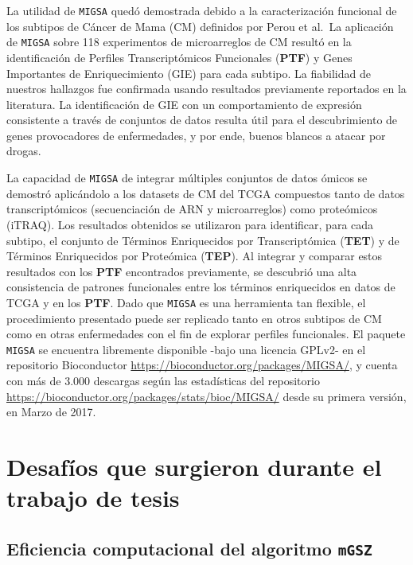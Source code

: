 \documentclass[12pt,twoside]{reedthesis}
\begin{document}
\par

La utilidad de \texttt{MIGSA} quedó demostrada debido a la caracterización funcional de los subtipos de Cáncer de Mama (CM) definidos por Perou et al.~La aplicación de \texttt{MIGSA} sobre 118 experimentos de microarreglos de CM resultó en la identificación de Perfiles Transcriptómicos Funcionales (\textbf{PTF}) y Genes Importantes de Enriquecimiento (GIE) para cada subtipo. La fiabilidad de nuestros hallazgos fue confirmada usando resultados previamente reportados en la literatura. La identificación de GIE con un comportamiento de expresión consistente a través de conjuntos de datos resulta útil para el descubrimiento de genes provocadores de enfermedades, y por ende, buenos blancos a atacar por drogas.

\par

La capacidad de \texttt{MIGSA} de integrar múltiples conjuntos de datos ómicos se demostró aplicándolo a los datasets de CM del TCGA compuestos tanto de datos transcriptómicos (secuenciación de ARN y microarreglos) como proteómicos (iTRAQ). Los resultados obtenidos se utilizaron para identificar, para cada subtipo, el conjunto de Términos Enriquecidos por Transcriptómica (\textbf{TET}) y de Términos Enriquecidos por Proteómica (\textbf{TEP}). Al integrar y comparar estos resultados con los \textbf{PTF} encontrados previamente, se descubrió una alta consistencia de patrones funcionales entre los términos enriquecidos en datos de TCGA y en los \textbf{PTF}. Dado que \texttt{MIGSA} es una herramienta tan flexible, el procedimiento presentado puede ser replicado tanto en otros subtipos de CM como en otras enfermedades con el fin de explorar perfiles funcionales. El paquete \texttt{MIGSA} se encuentra libremente disponible -bajo una licencia GPLv2- en el repositorio Bioconductor \url{https://bioconductor.org/packages/MIGSA/}, y cuenta con más de 3.000 descargas según las estadísticas del repositorio \url{https://bioconductor.org/packages/stats/bioc/MIGSA/} desde su primera versión, en Marzo de 2017.

\hypertarget{cap:desafios}{%
\chapter{Desafíos que surgieron durante el trabajo de tesis}\label{cap:desafios}}

\hypertarget{eficiencia-computacional-del-algoritmo-mgsz}{%
\section{\texorpdfstring{Eficiencia computacional del algoritmo \texttt{mGSZ}}{Eficiencia computacional del algoritmo mGSZ}}\label{eficiencia-computacional-del-algoritmo-mgsz}}
\end{document}
